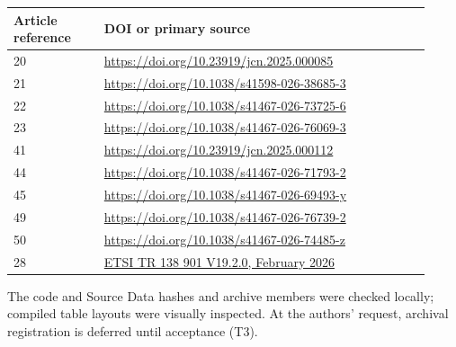 \documentclass[10pt,letterpaper]{article}
\begin{document}
\begin{longtable}{p{0.20\linewidth}p{0.72\linewidth}}\toprule Article reference & DOI or primary source\\\midrule\endhead

20 & \url{https://doi.org/10.23919/jcn.2025.000085}\\

21 & \url{https://doi.org/10.1038/s41598-026-38685-3}\\

22 & \url{https://doi.org/10.1038/s41467-026-73725-6}\\

23 & \url{https://doi.org/10.1038/s41467-026-76069-3}\\

41 & \url{https://doi.org/10.23919/jcn.2025.000112}\\

44 & \url{https://doi.org/10.1038/s41467-026-71793-2}\\

45 & \url{https://doi.org/10.1038/s41467-026-69493-y}\\

49 & \url{https://doi.org/10.1038/s41467-026-76739-2}\\

50 & \url{https://doi.org/10.1038/s41467-026-74485-z}\\

28 & \href{https://www.etsi.org/deliver/etsi_tr/138900_138999/138901/19.02.00_60/tr_138901v190200p.pdf}{ETSI TR 138 901 V19.2.0, February 2026}\\\bottomrule\end{longtable}

The code and Source Data hashes and archive members were checked locally; compiled table layouts were visually inspected. At the authors’ request, archival registration is deferred until acceptance (T3).
\end{document}
